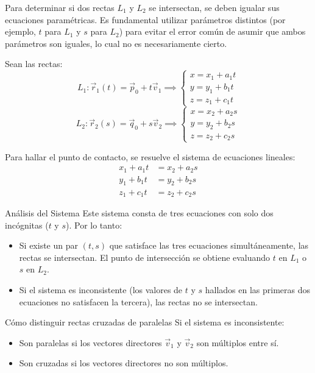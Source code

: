 Para determinar si dos rectas $L_1$ y $L_2$ se intersectan, se deben igualar sus ecuaciones paramétricas. Es fundamental utilizar parámetros distintos (por ejemplo, $t$ para $L_1$ y $s$ para $L_2$) para evitar el error común de asumir que ambos parámetros son iguales, lo cual no es necesariamente cierto.

Sean las rectas:
$$ L_1: \vec{r}_1(t) = \vec{p}_0 + t\vec{v}_1 \implies \begin{cases} x = x_1 + a_1 t \\ y = y_1 + b_1 t \\ z = z_1 + c_1 t \end{cases} $$
$$ L_2: \vec{r}_2(s) = \vec{q}_0 + s\vec{v}_2 \implies \begin{cases} x = x_2 + a_2 s \\ y = y_2 + b_2 s \\ z = z_2 + c_2 s \end{cases} $$

Para hallar el punto de contacto, se resuelve el sistema de ecuaciones lineales:
\begin{align}
    x_1 + a_1 t &= x_2 + a_2 s \\
    y_1 + b_1 t &= y_2 + b_2 s \\
    z_1 + c_1 t &= z_2 + c_2 s
\end{align}

\begin{mytheorem}{Análisis del Sistema}
Este sistema consta de tres ecuaciones con solo dos incógnitas ($t$ y $s$). Por lo tanto:
\begin{itemize}
    \item Si existe un par $(t, s)$ que satisface las tres ecuaciones simultáneamente, las rectas se intersectan. El punto de intersección se obtiene evaluando $t$ en $L_1$ o $s$ en $L_2$.
    \item Si el sistema es inconsistente (los valores de $t$ y $s$ hallados en las primeras dos ecuaciones no satisfacen la tercera), las rectas no se intersectan.
\end{itemize}
\end{mytheorem}

\begin{mynote}{Cómo distinguir rectas cruzadas de paralelas}
Si el sistema es inconsistente:
\begin{itemize}
    \item Son paralelas si los vectores directores $\vec{v}_1$ y $\vec{v}_2$ son múltiplos entre sí.
    \item Son cruzadas si los vectores directores no son múltiplos.
\end{itemize}
\end{mynote}

